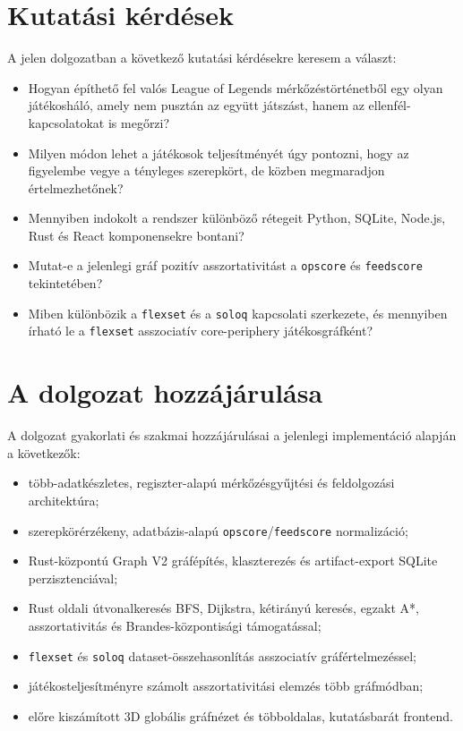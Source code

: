 ﻿\documentclass[a4paper,12pt]{report}
\begin{document}
\section{Kutatási kérdések}

A jelen dolgozatban a következő kutatási kérdésekre keresem a választ:

\begin{itemize}
    \item Hogyan építhető fel valós League of Legends mérkőzéstörténetből egy olyan játékosháló, amely nem pusztán az együtt játszást, hanem az ellenfél-kapcsolatokat is megőrzi?
    \item Milyen módon lehet a játékosok teljesítményét úgy pontozni, hogy az figyelembe vegye a tényleges szerepkört, de közben megmaradjon értelmezhetőnek?
    \item Mennyiben indokolt a rendszer különböző rétegeit Python, SQLite, Node.js, Rust és React komponensekre bontani?
    \item Mutat-e a jelenlegi gráf pozitív asszortativitást a \texttt{opscore} és \texttt{feedscore} tekintetében?
    \item Miben különbözik a \texttt{flexset} és a \texttt{soloq} kapcsolati szerkezete, és mennyiben írható le a \texttt{flexset} asszociatív core-periphery játékosgráfként?
\end{itemize}

\section{A dolgozat hozzájárulása}

A dolgozat gyakorlati és szakmai hozzájárulásai a jelenlegi implementáció alapján a következők:

\begin{itemize}
    \item több-adatkészletes, regiszter-alapú mérkőzésgyűjtési és feldolgozási architektúra;
    \item szerepkörérzékeny, adatbázis-alapú \texttt{opscore}/\texttt{feedscore} normalizáció;
    \item Rust-központú Graph V2 gráfépítés, klaszterezés és artifact-export SQLite perzisztenciával;
    \item Rust oldali útvonalkeresés BFS, Dijkstra, kétirányú keresés, egzakt A*, asszortativitás és Brandes-központisági támogatással;
    \item \texttt{flexset} és \texttt{soloq} dataset-összehasonlítás asszociatív gráfértelmezéssel;
    \item játékosteljesítményre számolt asszortativitási elemzés több gráfmódban;
    \item előre kiszámított 3D globális gráfnézet és többoldalas, kutatásbarát frontend.
\end{itemize}
\end{document}
